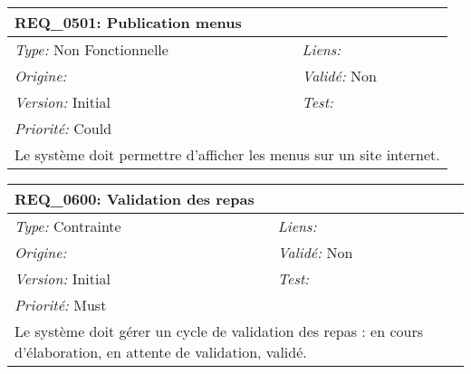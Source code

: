 \begin{table}[!h]

\begin{tabular}{|p{60mm}p{100mm}|}

\hline

\multicolumn{2}{|l|}{\textbf{REQ\_0501:} Publication menus} \\ \hline

\emph{Type:} Non Fonctionnelle & \emph{Liens:}  \\

\emph{Origine:}  & \emph{Validé:} Non \\

\emph{Version:} Initial & \emph{Test:}  \\

\emph{Priorité:} Could & \\ \hline

\multicolumn{2}{|p{16cm}|}{Le système doit permettre d'afficher les menus sur un site internet.} \\ \hline

\end{tabular}

\end{table}



\begin{table}[!h]

\begin{tabular}{|p{60mm}p{100mm}|}

\hline

\multicolumn{2}{|l|}{\textbf{REQ\_0600:} Validation des repas} \\ \hline

\emph{Type:} Contrainte & \emph{Liens:}  \\

\emph{Origine:}  & \emph{Validé:} Non \\

\emph{Version:} Initial & \emph{Test:}  \\

\emph{Priorité:} Must & \\ \hline

\multicolumn{2}{|p{16cm}|}{Le système doit gérer un cycle de validation des repas : en cours d'élaboration, en attente de validation, validé.} \\ \hline

\end{tabular}

\end{table}



